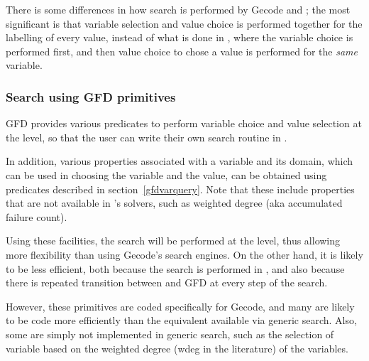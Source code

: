There is some differences in how search is performed by Gecode and \eclipse;
the most significant is that variable selection and value choice is performed
together for the labelling of every value, instead of what is done in \eclipse,
where the variable choice is performed first, and then value choice to chose
a value is performed for the {\it same} variable. 


\subsubsection{Search using GFD primitives}
\label{searchgfd}
GFD provides various predicates to perform variable choice
and value selection at the \eclipse level, so that the user can write their
own search routine in \eclipse. 

In addition, various properties associated
with a variable and its domain, which can be used in choosing the variable
and the value, can be obtained using predicates described
in section~\ref{gfdvarquery}. Note that these include properties that are not
available in
 \eclipse's solvers, such as weighted degree (aka accumulated failure count).

Using these facilities, the search will be performed
at the \eclipse level, thus allowing more flexibility than using Gecode's 
search engines. On the other hand, it is likely to be less efficient, both
because the search is performed in \eclipse, and also because there is
repeated transition between \eclipse and GFD at every step of the search.

However, these primitives are coded specifically for Gecode, and many are
likely to be code more efficiently than the equivalent available via 
generic search. Also, some are simply not implemented in generic search, 
such as the selection of variable based on the weighted degree (wdeg in the
literature) of the variables. 

